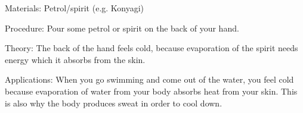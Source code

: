 \begin{multicols}{2}
\begin{description*}
\item[Materials:]{Petrol/spirit (e.g. Konyagi)}
\item[Procedure:]{Pour some petrol or spirit on the back of your hand.}
\item[Theory:]{The back of the hand feels cold, because evaporation of the spirit needs energy which it absorbs from the skin.}
\item[Applications:]{When you go swimming and come out of the water, you feel cold because evaporation of water from your body absorbs heat from your skin. This is also why the body produces sweat in order to cool down.}
\end{description*}




\end{multicols}

\pagebreak
